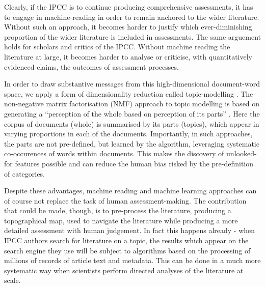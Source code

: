 \documentclass{article}
\begin{document}
\begin{linenumbers}


Clearly, if the IPCC is to continue producing comprehensive assessments, it has to engage in machine-reading in order to remain anchored to the wider literature. Without such an approach, it becomes harder to justify which ever-diminishing proportion of the wider literature is included in assessments. The same arguement holds for scholars and critics of the IPCC. Without machine reading the literature at large, it becomes harder to analyse or criticise, with quantitatively evidenced claims, the outcomes of assessment processes.



In order to draw substantive messages from this high-dimensional document-word space, we apply a form of dimensionality reduction called topic-modelling \citep{Blei2010}. The non-negative matrix factorisation (NMF) approach to topic modelling is based on generating a ``perception of the whole based on perception of its parts'' \citep{Lee1999}. Here the corpus of documents (whole) is summarised by its parts (topics), which appear in varying proportions in each of the documents. Importantly, in such approaches, the parts are not pre-defined, but learned by the algorithm, leveraging systematic co-occurences of words within documents. This makes the discovery of unlooked-for features possible and can reduce the human bias risked by the pre-definition of categories. 


Despite these advantages, machine reading and machine learning approaches can of course not replace the task of human assessment-making. The contribution that could be made, though, is to pre-process the literature, producing a topographical map, used to navigate the literature while producing a more detailed assessment with human judgement. In fact this happens already - when IPCC authors search for literature on a topic, the results which appear on the search engine they use will be subject to algorithms based on the processing of millions of records of article text and metadata. This can be done in a much more systematic way when scientists perform directed analyses of the literature at scale. 



\end{linenumbers}
\end{document}
